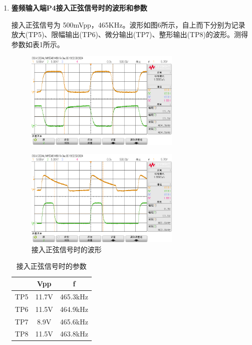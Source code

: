 \documentclass[UTF8]{ctexart}
\begin{document}
\begin{enumerate}[(1)]
    \item \textbf{鉴频输入端P4接入正弦信号时的波形和参数}

    接入正弦信号为 500mVpp，465KHz。波形如图6所示，自上而下分别为记录放大(TP5)、限幅输出(TP6)、微分输出(TP7)、整形输出(TP8)的波形。测得参数如表1所示。

    \begin{figure}[H]
        \centering
        \includegraphics[width=0.7\textwidth]{pics/11.png}
    \end{figure}
    \begin{figure}[H]
        \centering
        \includegraphics[width=0.7\textwidth]{pics/12.png}
        \caption{接入正弦信号时的波形}\label{fig:11}
    \end{figure}
    \vspace{-2em}
    \begin{table}[!ht]
        \centering

        \caption{接入正弦信号时的参数}
        
        \begin{tabular}{|c|c|c|}
        \hline
            & Vpp   & f        \\ \hline
        TP5 & 11.7V & 465.3kHz \\ \hline
        TP6 & 11.5V & 464.9kHz \\ \hline
        TP7 & 8.9V  & 465.6kHz \\ \hline
        TP8 & 11.5V & 463.8kHz \\ \hline
        \end{tabular}
    \end{table}


\end{enumerate}
\end{document}
